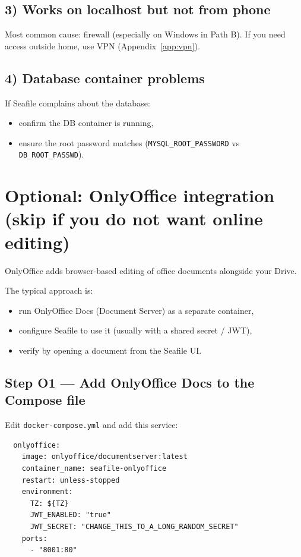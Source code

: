 \subsection{3) Works on localhost but not from phone}
Most common cause: firewall (especially on Windows in Path B).
If you need access outside home, use VPN (Appendix~\ref{app:vpn}).

\subsection{4) Database container problems}
If Seafile complains about the database:
\begin{itemize}[leftmargin=*]
  \item confirm the DB container is running,
  \item ensure the root password matches (\texttt{MYSQL\_ROOT\_PASSWORD} vs \texttt{DB\_ROOT\_PASSWD}).
\end{itemize}

\section{Optional: OnlyOffice integration (skip if you do not want online editing)}
\label{sec:sf_onlyoffice}
OnlyOffice adds browser-based editing of office documents alongside your Drive.

The typical approach is:
\begin{itemize}[leftmargin=*]
  \item run OnlyOffice Docs (Document Server) as a separate container,
  \item configure Seafile to use it (usually with a shared secret / JWT),
  \item verify by opening a document from the Seafile UI.
\end{itemize}


\subsection{Step O1 --- Add OnlyOffice Docs to the Compose file}
Edit \texttt{docker-compose.yml} and add this service:

\begin{lstlisting}
  onlyoffice:
    image: onlyoffice/documentserver:latest
    container_name: seafile-onlyoffice
    restart: unless-stopped
    environment:
      TZ: ${TZ}
      JWT_ENABLED: "true"
      JWT_SECRET: "CHANGE_THIS_TO_A_LONG_RANDOM_SECRET"
    ports:
      - "8001:80"
\end{lstlisting}

